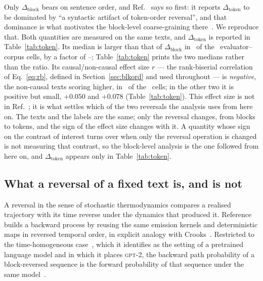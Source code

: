 \documentclass[11pt]{article}
\newcommand{\Dblock}{\Delta_{\mathrm{block}}}
\newcommand{\Dtok}{\Delta_{\mathrm{token}}}
\begin{document}
Only $\Dblock$ bears on sentence order, and Ref.~\cite{sagawa2026} says so
first: it reports $\Dtok$ to be dominated by ``a syntactic artifact of
token-order reversal'', and that dominance is what motivates the block-level
coarse-graining there~\cite{sagawa2026}.  We reproduce that.  Both quantities are measured on the same texts, and
$\Dtok$ is reported in Table~\ref{tab:token}.  Its median is larger than
that of $\Dblock$ in \NTokLarger\ of the \NTokCells\ evaluator--corpus
cells, by a factor of \SigTokRatioMin--\SigTokRatioMax;
Table~\ref{tab:token} prints the two medians rather than the ratio.
Its causal/non-causal effect size $r$ --- the rank-biserial correlation of
Eq.~\eqref{eq:rb}, defined in Section~\ref{sec:blkord} and used throughout
--- is \emph{negative}, the non-causal texts scoring higher, in
\NTokNegAR\ of the \NTokNegARTot\ cells; in the other two it is positive
but small, $+0.050$ and $+0.078$ (Table~\ref{tab:token}).  This effect size is not in
Ref.~\cite{sagawa2026}; it is what settles which of the two reversals the
analysis uses from here on.  The texts and the labels are the same; only
the reversal changes, from blocks to tokens, and the sign of the effect
size changes with it.  A quantity whose sign on the contrast of interest
turns over when only the reversal operation is changed is not measuring
that contrast, so the block-level analysis is the one followed from here
on, and $\Dtok$ appears only in Table~\ref{tab:token}.

\begin{table}[t]
\centering

\caption{Token reversal and block reversal side by side on the same texts,
which is the comparison this section makes: the medians of $\Dtok$ and
$\Dblock$, and the rank-biserial effect size $r$ of Eq.~\eqref{eq:rb} under
the token reversal.  It is
shown first because the choice of block reversal, on which everything after it
depends, rests on it.  Reversing the token order destroys syntax, so $\Dtok$
is dominated by grammaticality: its median is larger than that of $\Dblock$
in \NTokLarger\ of \NTokCells\ cells, and $r$ is negative --- the
non-causal texts scoring higher --- in \NTokNegAR\ of the
\NTokNegARTot\ cells of this table, and small and positive in the rest.  Nothing else in this paper reads $\Dtok$.}
\label{tab:token}
\end{table}

\subsection{What a reversal of a fixed text is, and is not}
\label{sec:notareversal}
A reversal in the sense of stochastic thermodynamics compares a realised
trajectory with its time reverse under the dynamics that produced it.
Reference~\cite{sagawa2026} builds a backward process by reusing the same
emission kernels and deterministic maps in reversed temporal order, in
explicit analogy with Crooks~\cite[Sec.~III~A]{sagawa2026}.  Restricted to
the time-homogeneous case~\cite[Eq.~(27)]{sagawa2026}, which it identifies as
the setting of a pretrained language model and in which it places
\textsc{gpt-2}, the backward path probability of a block-reversed sequence
is the forward probability of that sequence under the same
model~\cite[Eq.~(31)]{sagawa2026}.
\end{document}

